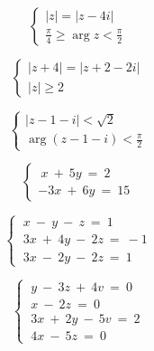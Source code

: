 \documentclass[a4paper]{article}
\begin{document}
$$ \begin{cases}
|z| = |z-4i| \\
\frac{\pi}{4} \geq \arg{z} < \frac{\pi}{2} 
\end{cases} $$

$$ \begin{cases}
|z+4| = |z+2-2i| \\
|z| \geq 2
\end{cases} $$

$$ \begin{cases}
|z-1-i| < \sqrt{2} \\
\arg{(z-1-i)} < \frac{\pi}{2} 
\end{cases} $$

$$ \begin{cases}
\ x \ + \ 5y \ = \ 2 \\
-3x \ + \ 6y \ = \ 15
\end{cases} $$

$$ \begin{cases}
\ x \ - \ y \ - \ z \ = \ 1 \\
\ 3x \ + \ 4y \ - \ 2z \ = \ -1 \\
\ 3x \ - \ 2y \ - \ 2z \ = \ 1
\end{cases} $$

$$ \begin{cases}
\ y \ - \ 3z \ + \ 4v \ = \ 0 \\
\ x \ - \ 2z \ = \ 0 \\
\ 3x \ + \ 2y \ - \ 5v \ = \ 2 \\
\ 4x \ - \ 5z \ = \ 0
\end{cases} $$
\end{document}
